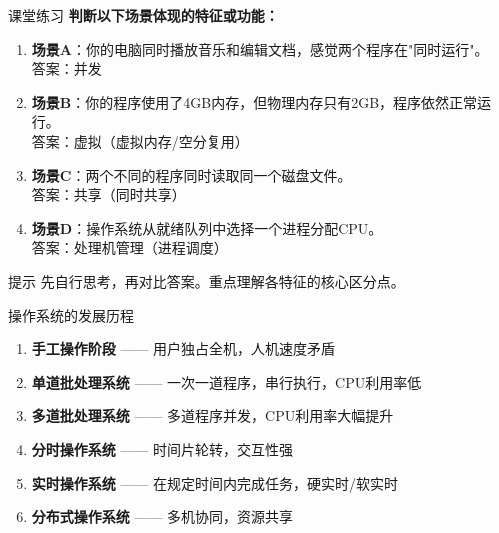 \documentclass[10pt, aspectratio=169]{beamer}
\begin{document}
\begin{frame}{课堂练习}
    \textbf{判断以下场景体现的特征或功能：}
    \vspace{0.5em}
    \begin{enumerate}
        \item \textbf{场景A}：你的电脑同时播放音乐和编辑文档，感觉两个程序在"同时运行"。\\
        \textcolor{white!30!black}{\tiny 答案：并发}
        \vspace{0.3em}
        \item \textbf{场景B}：你的程序使用了4GB内存，但物理内存只有2GB，程序依然正常运行。\\
        \textcolor{white!30!black}{\tiny 答案：虚拟（虚拟内存/空分复用）}
        \vspace{0.3em}
        \item \textbf{场景C}：两个不同的程序同时读取同一个磁盘文件。\\
        \textcolor{white!30!black}{\tiny 答案：共享（同时共享）}
        \vspace{0.3em}
        \item \textbf{场景D}：操作系统从就绪队列中选择一个进程分配CPU。\\
        \textcolor{white!30!black}{\tiny 答案：处理机管理（进程调度）}
    \end{enumerate}
    \vspace{0.5em}
    \begin{alertblock}{提示}
        先自行思考，再对比答案。重点理解各特征的核心区分点。
    \end{alertblock}
\end{frame}

\begin{frame}{操作系统的发展历程}
    \begin{enumerate}
        \item \textbf{手工操作阶段} —— 用户独占全机，人机速度矛盾
        \item \textbf{单道批处理系统} —— 一次一道程序，串行执行，CPU利用率低
        \item \textbf{多道批处理系统} —— 多道程序并发，CPU利用率大幅提升
        \item \textbf{分时操作系统} —— 时间片轮转，交互性强
        \item \textbf{实时操作系统} —— 在规定时间内完成任务，硬实时/软实时
        \item \textbf{分布式操作系统} —— 多机协同，资源共享
    \end{enumerate}
\end{frame}
\end{document}
